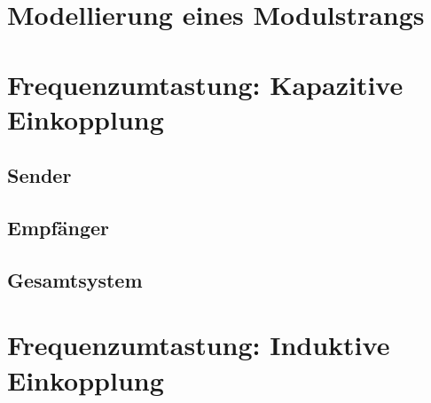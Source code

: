 \clearpage
\section{Modellierung eines Modulstrangs}
\label{sec:simu:model:module:string}

\section{Frequenzumtastung: Kapazitive Einkopplung}
\label{sec:simu:fsk:capacitive}

\subsection{Sender}
\label{sec:simu:fsk:capacitive:transmitter}

\subsection{Empf\"anger}
\label{sec:simu:fsk:capacitive:receiver}

\subsection{Gesamtsystem}
\label{sec:simu:fsk:capacitive:system}

\section{Frequenzumtastung: Induktive Einkopplung}
\label{sec:simu:fsk:inductive}

